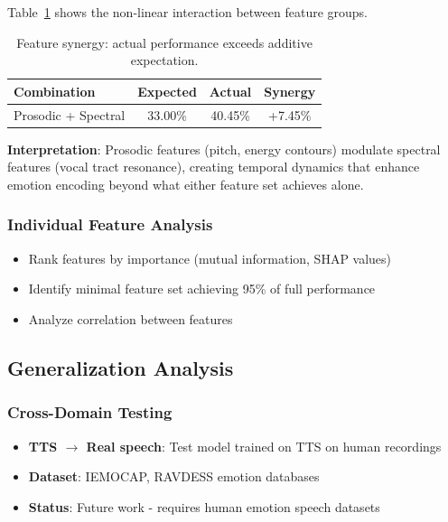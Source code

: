 Table~\ref{tab:synergy} shows the non-linear interaction between feature groups.

\begin{table}[t]
\centering
\small
\begin{tabular}{lccc}
\toprule
\textbf{Combination} & \textbf{Expected} & \textbf{Actual} & \textbf{Synergy} \\
\midrule
Prosodic + Spectral & 33.00\% & 40.45\% & +7.45\% \\
\bottomrule
\end{tabular}
\caption{Feature synergy: actual performance exceeds additive expectation.}
\label{tab:synergy}
\end{table}

\textbf{Interpretation}: Prosodic features (pitch, energy contours) modulate spectral features (vocal tract resonance), creating temporal dynamics that enhance emotion encoding beyond what either feature set achieves alone.

\subsubsection{Individual Feature Analysis}
\begin{itemize}
    \item Rank features by importance (mutual information, SHAP values)
    \item Identify minimal feature set achieving 95\% of full performance
    \item Analyze correlation between features
\end{itemize}

\subsection{Generalization Analysis}
\label{subsec:generalization}

\subsubsection{Cross-Domain Testing}
\begin{itemize}
    \item \textbf{TTS $\to$ Real speech}: Test model trained on TTS on human recordings
    \item \textbf{Dataset}: IEMOCAP, RAVDESS emotion databases
    \item \textbf{Status}: Future work - requires human emotion speech datasets
\end{itemize}

